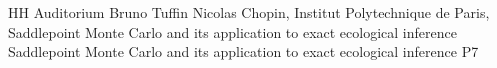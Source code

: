 {HH Auditorium}	%
{Bruno Tuffin}		%
{Nicolas Chopin, Institut Polytechnique de Paris, Saddlepoint Monte Carlo and its application to exact ecological inference}	%
{Saddlepoint Monte Carlo and its application to exact ecological inference}		%
{P7}		%
\\\hline
